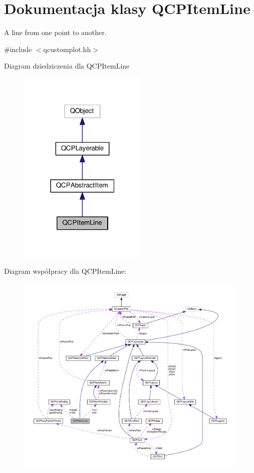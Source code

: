 \hypertarget{class_q_c_p_item_line}{}\section{Dokumentacja klasy Q\+C\+P\+Item\+Line}
\label{class_q_c_p_item_line}


A line from one point to another.  




{\ttfamily \#include $<$qcustomplot.\+hh$>$}



Diagram dziedziczenia dla Q\+C\+P\+Item\+Line\nopagebreak
\begin{figure}[H]
\begin{center}
\leavevmode
\includegraphics[width=175pt]{class_q_c_p_item_line__inherit__graph}
\end{center}
\end{figure}


Diagram współpracy dla Q\+C\+P\+Item\+Line\+:\nopagebreak
\begin{figure}[H]
\begin{center}
\leavevmode
\includegraphics[width=350pt]{class_q_c_p_item_line__coll__graph}
\end{center}
\end{figure}

